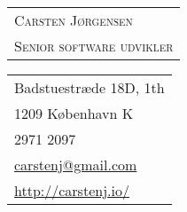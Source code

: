\documentclass[10pt, a4paper]{article}
\begin{document}
\begin{minipage}[t][2cm][t]{.5\textwidth}
\begin{tabular}{@{}l@{}} %
\\
{\Huge\scshape Carsten Jørgensen} \\[2.35ex]
{\LARGE\scshape Senior software udvikler}
\end{tabular}
\end{minipage}
\hfill
\begin{minipage}[t][2cm][t]{.4\textwidth}
\hfill
\begin{tabular}{l}
Badstuestræde 18D, 1th \\
1209 København K \\[1ex]
2971 2097 \\
\href{mailto:carstenj@gmail.com}{carstenj@gmail.com} \\
\href{http://carstenj.io/}{http://carstenj.io/} 
\end{tabular}
\end{minipage}

\end{document}
